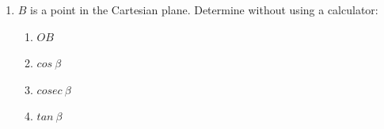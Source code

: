 \begin{exercises}{}
{
  \begin{enumerate}[itemsep=5pt, label=\textbf{\arabic*}. ]
   \item $B$ is a point in the Cartesian plane. Determine without using a calculator:
\begin{enumerate}[noitemsep, label=\textbf{(\alph*)} ]
 \item $OB$
\item $cos~\beta$
\item $cosec~\beta$
\item $tan~\beta$
\end{enumerate}



\end{enumerate}}
\end{exercises}
